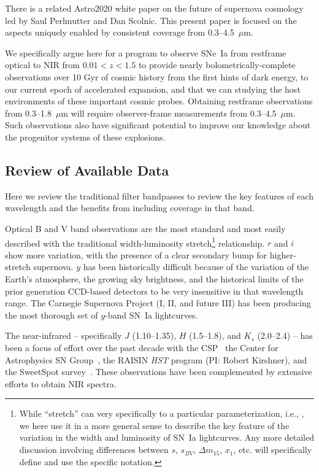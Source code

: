 \documentclass[12pt,preprint]{aastex}
\newcommand{\snia}{SN~Ia\xspace}
\newcommand{\sneia}{SNe~Ia\xspace}
\begin{document}
There is a related Astro2020 white paper on the future of supernova cosmology led by Saul Perlmutter and Dan Scolnic.  This present paper is focused on the aspects uniquely enabled by consistent coverage from 0.3--4.5~$\mu$m.

We specifically argue here for a program to observe \sneia from restframe optical to NIR from $0.01<z<1.5$ to provide nearly bolometrically-complete observations over 10 Gyr of cosmic history from the first hints of dark energy, to our current epoch of accelerated expansion, and that we can studying the host environments of these important cosmic probes.  Obtaining restframe observations from 0.3--1.8~$\mu$m will require observer-frame measurements from 0.3--4.5~$\mu$m.
  Such observations also have significant potential to improve our knowledge about the progenitor systems of these explosions.

\subsection{Review of Available Data}
Here we review the traditional filter bandpasses to review the key features of each wavelength and the benefits from including coverage in that band.

Optical B and V band observations are the most standard and most easily described with the traditional width-luminosity stretch\footnote{While ``stretch'' can very specifically to a particular parameterization, i.e., \citet{Goldhaber01}, we here use it in a more general sense to describe the key feature of the variation in the width and luminosity of \snia lightcurves.  Any more detailed discussion involving differences between $s$, $s_{BV}$, $\Delta m_{15}$, $x_1$, etc. will specifically define and use the specific notation.} relationship.  $r$ and $i$ show more variation, with the presence of a clear secondary bump for higher-stretch supernova.  $y$ has been historically difficult because of the variation of the Earth's atmosphere, the growing sky brightness, and the historical limits of the prior generation CCD-based detectors to be very insensitive in that wavelength range.  The Carnegie Supernova Project (I, II, and future III) has been producing the most thorough set of $y$-band \snia lightcurves.

The near-infrared -- specifically $J$ (1.10--1.35), $H$ (1.5--1.8), and $K_s$ (2.0--2.4) -- has been a focus of effort over the past decade with the CSP~\citep{Contreras10, Krisciunas17} the Center for Astrophysics SN Group~\citep{Wood-Vasey08, Friedman15}, the RAISIN {\it HST} program (PI: Robert Kirshner), and the SweetSpot survey~\citep{Weyant14, Weyant18}.  These observations have been complemented by extensive efforts to obtain NIR spectra.
\end{document}
